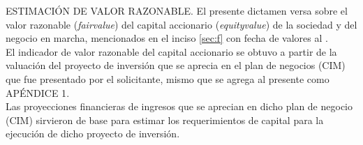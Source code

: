 \textcolor{secundario}{ESTIMACI\'ON DE VALOR RAZONABLE.} El presente dictamen versa sobre el valor razonable (\textit{\gls{fairvalue}}) del capital accionario (\textit{\gls{equityvalue}}) de la sociedad \empresaSolicitante y del negocio en marcha, mencionados en el inciso \autoref{sec:f} con fecha de valores al \fechaValores.\\[10pt]

El indicador de valor razonable del capital accionario se obtuvo a partir de la valuaci\'on del proyecto de inversi\'on que se aprecia en el plan de negocios (CIM) que fue presentado por el solicitante, mismo que se agrega al presente como \textcolor{secundario}{AP\'ENDICE 1}.\\ 

Las proyecciones financieras de ingresos que se aprecian en dicho plan de negocio (CIM) sirvieron de base para estimar los requerimientos de  capital para la ejecuci\'on de dicho proyecto de inversi\'on.
